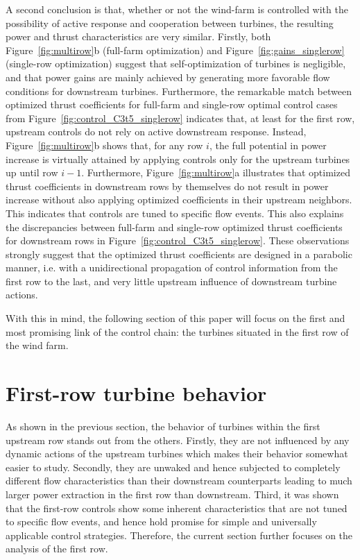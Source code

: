 \documentclass[wes, manuscript]{copernicus}
\begin{document}
A second conclusion is that, whether or not the wind-farm is controlled with the possibility of active response and cooperation between turbines, the resulting power and thrust characteristics are very similar. Firstly, both Figure~\ref{fig:multirow}b (full-farm optimization) and Figure~\ref{fig:gains_singlerow} (single-row optimization) suggest that self-optimization of turbines is negligible, and that power gains are mainly achieved by generating more favorable flow conditions for downstream turbines. Furthermore, the remarkable match between optimized thrust coefficients for full-farm and single-row optimal control cases from Figure~\ref{fig:control_C3t5_singlerow} indicates that, at least for the first row, upstream controls do not rely on active downstream response. Instead, Figure~\ref{fig:multirow}b shows that, for any row $i$, the full potential in power increase is virtually attained by applying controls only for the upstream turbines up until row $i-1$. Furthermore, Figure~\ref{fig:multirow}a illustrates that optimized thrust coefficients in downstream rows by themselves do not result in power increase without also applying optimized coefficients in their upstream neighbors. This indicates that controls are tuned to specific flow events. This also explains the discrepancies between full-farm and single-row optimized thrust coefficients for downstream rows in Figure~\ref{fig:control_C3t5_singlerow}. 
These observations strongly suggest that the optimized thrust coefficients are designed in a parabolic manner, i.e. with a unidirectional propagation of control information from the first row to the last, and very little upstream influence of downstream turbine actions.

With this in mind, the following section of this paper will focus on the first and most promising link of the control chain: the turbines situated in the first row of the wind farm.

\section{First-row turbine behavior}\label{sec:analysis_flow_vis}
As shown in the previous section, the behavior of turbines within the first upstream row stands out from the others. Firstly, they are not influenced by any dynamic actions of the upstream turbines which makes their behavior somewhat easier to study. Secondly, they are unwaked and hence subjected to completely different flow characteristics than their downstream counterparts leading to much larger power extraction in the first row than downstream. Third, it was shown that the first-row controls show some inherent characteristics that are not tuned to specific flow events, and hence hold promise for simple and universally applicable control strategies. Therefore, the current section further focuses on the analysis of the first row. 
\end{document}

